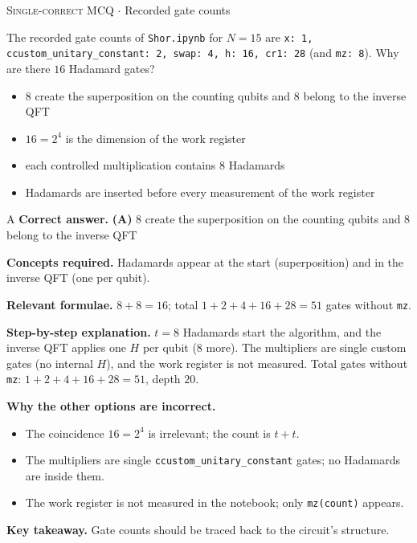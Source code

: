\documentclass[11pt,a4paper]{article}
\newcommand{\optlabel}[1]{\textbf{(#1)}}
\newcommand{\correctlabel}[1]{\textcolor{okgreen}{\textbf{(#1)}\,\ding{51}}}
\newenvironment{qitem}[1]{\begin{list}{}{\setlength{\leftmargin}{3.3em}\setlength{\labelwidth}{3.1em}%
  \setlength{\labelsep}{0.2em}\setlength{\topsep}{3pt}\setlength{\parsep}{3pt}}\item[\textbf{Q.#1}\hfill]}{\end{list}}
\newcommand{\qsep}{\par\vspace{2pt}{\color{black!15}\hrule}\vspace{4pt}}
\newcommand{\qmeta}[2]{{\footnotesize\color{black!60}\textsc{#1} \;$\cdot$\; #2}\par}
\begin{document}
\begin{qitem}{67}
\qmeta{Single-correct MCQ}{Recorded gate counts}
The recorded gate counts of \texttt{Shor.ipynb} for $N = 15$ are \texttt{x: 1, ccustom\_unitary\_constant: 2, swap: 4, h: 16, cr1: 28} (and
\texttt{mz: 8}). Why are there $16$ Hadamard gates?
\begin{itemize}[leftmargin=2.6em, labelsep=0.4em, itemsep=2pt, topsep=3pt]
\item[\correctlabel{A}] $8$ create the superposition on the counting qubits and $8$ belong to the inverse QFT
\item[\optlabel{B}] $16 = 2^4$ is the dimension of the work register
\item[\optlabel{C}] each controlled multiplication contains $8$ Hadamards
\item[\optlabel{D}] Hadamards are inserted before every measurement of the work register
\end{itemize}
\end{qitem}
\begin{solbox}{A}
\textbf{\color{brand}Correct answer.} \textcolor{okgreen}{\textbf{(A)}} $8$ create the superposition on the counting qubits and $8$ belong to the inverse QFT

\textbf{\color{brand}Concepts required.} Hadamards appear at the start (superposition) and in the inverse QFT (one per qubit).

\textbf{\color{brand}Relevant formulae.} $8 + 8 = 16$; total $1 + 2 + 4 + 16 + 28 = 51$ gates without \texttt{mz}.

\textbf{\color{brand}Step-by-step explanation.} $t = 8$ Hadamards start the algorithm, and the inverse QFT applies one $H$ per qubit ($8$ more). The multipliers are single custom gates (no internal $H$),
and the work register is not measured. Total gates without \texttt{mz}: $1 + 2 + 4 + 16 + 28 = 51$, depth $20$.

\textbf{\color{brand}Why the other options are incorrect.}
\begin{itemize}[leftmargin=2.4em, itemsep=1pt, topsep=2pt]
\item[\textbf{(B)}] The coincidence $16 = 2^4$ is irrelevant; the count is $t + t$.
\item[\textbf{(C)}] The multipliers are single \texttt{ccustom\_unitary\_constant} gates; no Hadamards are inside them.
\item[\textbf{(D)}] The work register is not measured in the notebook; only \texttt{mz(count)} appears.
\end{itemize}
\textbf{\color{brand}Key takeaway.} Gate counts should be traced back to the circuit's structure.
\end{solbox}
\qsep
\end{document}
